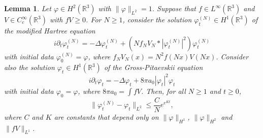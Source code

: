 \documentclass[11pt,a4paper,draft,DIV11]{scrartcl}	%
\newtheorem{lem}[thm]{Lemma}
\newcommand{\R}{\mathds{R}}
\begin{document}
\begin{lem} \label{lem:phitN2phit}
  Let $\varphi \in H^2(\R^3)$ with $\| \varphi \|_{L^2} = 1$. Suppose that
  $f \in L^\infty(\R^3)$ and $V \in C_c^\infty(\R^3)$ with $fV \ge 0$. For $N \ge
  1$, consider the solution $\varphi_t^{(N)} \in H^1(\R^3)$ of the modified
  Hartree equation
  \[
    i \partial_t \varphi_t^{(N)} = - \Delta \varphi_t^{(N)} + (N f_N V_N *
    |\varphi_t^{(N)}|^2) \varphi_t^{(N)}
  \]
  with initial data $\varphi^{(N)}_0 = \varphi$, where $f_N V_N(x) = N^2
  f(Nx)V(Nx)$. Consider also the solution $\varphi_t \in H^1(\R^3)$ of the
  Gross-Pitaevskii equation
  \[
    i \partial_t \varphi_t = - \Delta \varphi_t + 8 \pi a_0 |\varphi_t|^2
    \varphi_t
  \]
  with initial data $\varphi_0 = \varphi$, where $8 \pi a_0 = \int f V$.
  Then, for all $N \ge 1$ and $t \ge 0$,
  \[
    \| \varphi_t^{(N)} - \varphi_t \|_{L^2} \le \frac{C}{N} e^{e^{K t}},
  \]
  where $C$ and $K$ are constants that depend only on $\| \varphi \|_{H^1}$,
  $\| \varphi \|_{H^2}$ and $\| fV \|_{L^1}$.
\end{lem}
\end{document}
